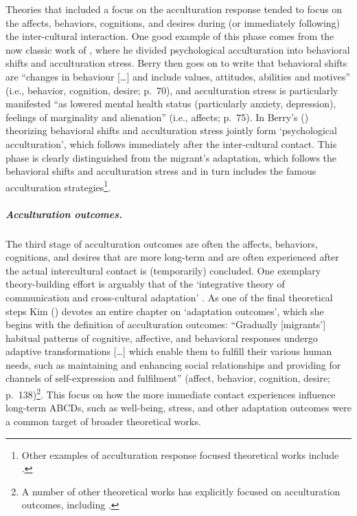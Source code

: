 \documentclass[man, 12pt, a4paper, mask]{apa7}
\begin{document}
Theories that included a focus on the acculturation response tended to
focus on the affects, behaviors, cognitions, and desires during (or
immediately following) the inter-cultural interaction. One good example
of this phase comes from the now classic work of \citet[][]{Berry1992},
where he divided psychological acculturation into behavioral shifts and
acculturation stress. Berry then goes on to write that behavioral shifts
are ``changes in behaviour {[}\ldots{]} and include values, attitudes,
abilities and motives'' (i.e., behavior, cognition, desire; p.~70), and
acculturation stress is particularly manifested ``as lowered mental
health status (particularly anxiety, depression), feelings of
marginality and alienation'' (i.e., affects; p.~75). In Berry's
(\citeyear{Berry1992}) theorizing behavioral shifts and acculturation
stress jointly form `psychological acculturation', which follows
immediately after the inter-cultural contact. This phase is clearly
distinguished from the migrant's adaptation, which follows the
behavioral shifts and acculturation stress and in turn includes the
famous acculturation
strategies\footnote{Other examples of acculturation response focused theoretical works include \citet[][]{Berry2005, Sam2003, Riedel2011, Ward2016}.}.

\subparagraph{Acculturation outcomes.}

The third stage of acculturation outcomes are often the affects,
behaviors, cognitions, and desires that are more long-term and are often
experienced after the actual intercultural contact is (temporarily)
concluded. One exemplary theory-building effort is arguably that of the
`integrative theory of communication and cross-cultural adaptation'
\citep[][]{Kim1988}. As one of the final theoretical steps Kim
(\citeyear[][]{Kim1988}) devotes an entire chapter on `adaptation
outcomes', which she begins with the definition of acculturation
outcomes: ``Gradually {[}migrants'{]} habitual patterns of cognitive,
affective, and behavioral responses undergo adaptive transformations
{[}\ldots{]} which enable them to fulfill their various human needs,
such as maintaining and enhancing social relationships and providing for
channels of self-expression and fulfilment'' (affect, behavior,
cognition, desire;
p.~138)\footnote{A number of other theoretical works has explicitly focused on acculturation outcomes, including \citet[][]{Baird2015, Berry1998, Berry1992, Berry2005, Riedel2011, Rogler1994, Luedicke2011}.}.
This focus on how the more immediate contact experiences influence
long-term ABCDs, such as well-being, stress, and other adaptation
outcomes were a common target of broader theoretical works.
\end{document}

